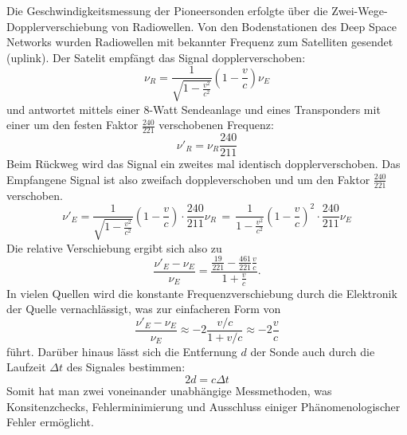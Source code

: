 \documentclass[a4paper,10pt]{article}
\begin{document}
Die Geschwindigkeitsmessung der Pioneersonden erfolgte über die Zwei-Wege-Dopplerverschiebung von Radiowellen.
Von den Bodenstationen des Deep Space Networks wurden Radiowellen mit bekannter Frequenz zum Satelliten gesendet (uplink).
Der Satelit empfängt das Signal dopplerverschoben:
\begin{equation}
 \nu_R = \frac{1}{\sqrt{1-\frac{v^2}{c^2}}}(1-\frac{v}{c})\nu_E
\end{equation}
und antwortet mittels einer 8-Watt Sendeanlage und eines Transponders
mit einer um den festen Faktor $ \frac{240}{221} $ verschobenen Frequenz:
\begin{equation}
\nu'_R = \nu_R\frac{240}{211}
\end{equation}
Beim Rückweg wird das Signal ein zweites mal identisch dopplerverschoben.
Das Empfangene Signal ist also zweifach doppleverschoben und um den Faktor $\frac{240}{221}$ verschoben.
\begin{equation}
 \nu'_E = \frac{1}{\sqrt{1-\frac{v^2}{c^2}}}(1-\frac{v}{c}) \cdot \frac{240}{211}\nu_R \, = \, \frac{1}{1-\frac{v^2}{c^2}}(1-\frac{v}{c})^2 \cdot \frac{240}{211} \nu_E
\end{equation}
Die relative Verschiebung ergibt sich also zu
\begin{equation}
 \frac{\nu'_E-\nu_E}{\nu_E} = \frac{\frac{19}{221}- \frac{461}{221}\frac{v}{c}}{1+\frac{v}{c}}.
\end{equation}
In vielen Quellen wird die konstante Frequenzverschiebung durch die Elektronik der Quelle vernachlässigt, was zur einfacheren Form von
\begin{equation}
 \frac{\nu'_E-\nu_E}{\nu_E} \approx -2\frac{v/c}{1+v/c} \approx -2 \frac{v}{c}
\end{equation}
führt.
Darüber hinaus lässt sich die Entfernung $d$ der Sonde auch durch die Laufzeit $\Delta t$ des Signales bestimmen:
\begin{equation}
 2d = c \Delta t
\end{equation}
Somit hat man zwei voneinander unabhängige Messmethoden, was Konsitenzchecks,
Fehlerminimierung und Ausschluss einiger Phänomenologischer Fehler ermöglicht.
\end{document}
